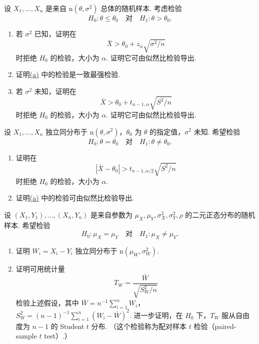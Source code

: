 \begin{exercise}\label{exercise:8.37}
设 $X_1,\ldots,X_n$ 是来自 $\mathrm n(\theta,\sigma^2)$ 总体的随机样本. 考虑检验
$$H_0:\theta\le\theta_0\quad\text{对}\quad H_1:\theta>\theta_0.$$
\begin{enumerate}
\item{}\label{itm:exercise:8.37:a} 若 $\sigma^2$ 已知，证明在
$$\bar X>\theta_0+z_\alpha\sqrt{\sigma^2/n}$$
时拒绝 $H_0$ 的检验，大小为 $\alpha$. 证明它可由似然比检验导出.
\item 证明\hyperref[itm:exercise:8.37:a]{(a)} 中的检验是一致最强检验.
\item 若 $\sigma^2$ 未知，证明在
$$\bar X>\theta_0+t_{n-1,\alpha}\sqrt{S^2/n}$$
时拒绝 $H_0$ 的检验，大小为 $\alpha$. 证明它可由似然比检验导出.
\end{enumerate}
\end{exercise}
\begin{exercise}\label{exercise:8.38}
设 $X_1,\ldots,X_n$ 独立同分布于 $\mathrm n(\theta,\sigma^2)$，$\theta_0$ 为 $\theta$ 的指定值，$\sigma^2$ 未知. 希望检验
$$H_0:\theta=\theta_0\quad\text{对}\quad H_1:\theta\ne\theta_0.$$
\begin{enumerate}
\item{}\label{itm:exercise:8.38:a} 证明在
$$|\bar X-\theta_0|>t_{n-1,\alpha/2}\sqrt{S^2/n}$$
时拒绝 $H_0$ 的检验，大小为 $\alpha$.
\item 证明\hyperref[itm:exercise:8.38:a]{(a)} 中的检验可由似然比检验导出.
\end{enumerate}
\end{exercise}
\begin{exercise}\label{exercise:8.39}
设 $(X_1,Y_1),\ldots,(X_n,Y_n)$ 是来自参数为 $\mu_X,\mu_Y,\sigma_X^2,\sigma_Y^2,\rho$ 的二元正态分布的随机样本. 希望检验
$$H_0:\mu_X=\mu_Y\quad\text{对}\quad H_1:\mu_X\ne\mu_Y.$$
\begin{enumerate}
\item 证明 $W_i=X_i-Y_i$ 独立同分布于 $\mathrm n(\mu_W,\sigma_W^2)$.
\item 证明可用统计量
$$T_W=\frac{\bar W}{\sqrt{S_W^2/n}}$$
检验上述假设，其中 $\bar W=n^{-1}\sum_{i=1}^nW_i$，$S_W^2=(n-1)^{-1}\sum_{i=1}^n(W_i-\bar W)^2$. 进一步证明，在 $H_0$ 下，$T_W$ 服从自由度为 $n-1$ 的 Student $t$ 分布. （这个检验称为配对样本 $t$ 检验（paired-sample $t$ test\mbox{）.}）
\end{enumerate}
\end{exercise}
